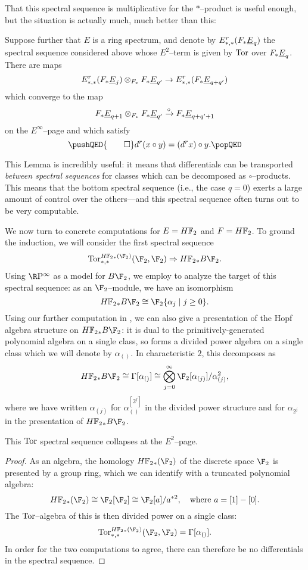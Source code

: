 That this spectral sequence is multiplicative for the \(\ast\)--product is useful enough, but the situation is actually much, much better than this:
\begin{lemma}\label{CircProductAndDifferentials}
Suppose further that \(E\) is a ring spectrum, and denote by \(E^r_{*, *}(F_* \OS{E}{q})\) the spectral sequence considered above whose \(E^2\)--term is given by \(\operatorname{Tor}\) over \(F_* \OS{E}{q}\).  There are maps \[E^r_{*, *}(F_* \OS{E}{j}) \otimes_{F_*} F_* \OS{E}{q'} \to E^r_{*, *}(F_* \OS{E}{q+q'})\] which converge to the map \[F_* \OS{E}{q+1} \otimes_{F_*} F_* \OS{E}{q'} \xrightarrow{\circ} F_* \OS{E}{q+q'+1}\] on the \(E^\infty\)--page and which satisfy
\[
\pushQED{\qed}
d^r(x \circ y) = (d^r x) \circ y. \qedhere
\popQED
\]
\end{lemma}
\noindent This Lemma is incredibly useful: it means that differentials can be transported \emph{between spectral sequences} for classes which can be decomposed as \(\circ\)--products.  This means that the bottom spectral sequence (i.e., the case \(q = 0\)) exerts a large amount of control over the others---and this spectral sequence often turns out to be very computable.

We now turn to concrete computations for \(E = \HFtwo\) and \(F = \HFtwo\).  To ground the induction, we will consider the first spectral sequence \[\Tor^{\HFtwo_*(\F_2)}_{*, *}(\F_2, \F_2) \Rightarrow \HFtwo_* B\F_2.\]  Using \(\RP^\infty\) as a model for \(B\F_2\), we employ  to analyze the target of this spectral sequence: as an \(\F_2\)--module, we have an isomorphism \[\HFtwo_* B\F_2 \cong \F_2\{\alpha_j \mid j \ge 0\}.\]  Using our further computation in , we can also give a presentation of the Hopf algebra structure on \(\HFtwo_* B\F_2\): it is dual to the primitively-generated polynomial algebra on a single class, so forms a divided power algebra on a single class which we will denote by \(\alpha_{()}\).  In characteristic \(2\), this decomposes as \[\HFtwo_* B\F_2 \cong \Gamma[\alpha_{()}] \cong \bigotimes_{j=0}^\infty \F_2[\alpha_{(j)}] / \alpha_{(j)}^2,\] where we have written \(\alpha_{(j)}\) for \(\alpha_{()}^{[2^j]}\) in the divided power structure and for \(\alpha_{2^j}\) in the presentation of \(\HFtwo_* B\F_2\).

\begin{corollary}
This \(\operatorname{Tor}\) spectral sequence collapses at the \(E^2\)--page.
\end{corollary}
\begin{proof}
As an algebra, the homology \(\HFtwo_*(\F_2)\) of the discrete space \(\F_2\) is presented by a group ring, which we can identify with a truncated polynomial algebra: \[\HFtwo_*(\F_2) \cong \F_2[\F_2] \cong  \F_2[a] / a^{\ast 2}, \quad \text{where \(a = [1] - [0]\)}.\]  The \(\operatorname{Tor}\)--algebra of this is then divided power on a single class: \[\Tor^{\HFtwo_*(\F_2)}_{*, *}(\F_2, \F_2) = \Gamma[\alpha_{()}].\]  In order for the two computations to agree, there can therefore be no differentials in the spectral sequence.
\end{proof}

